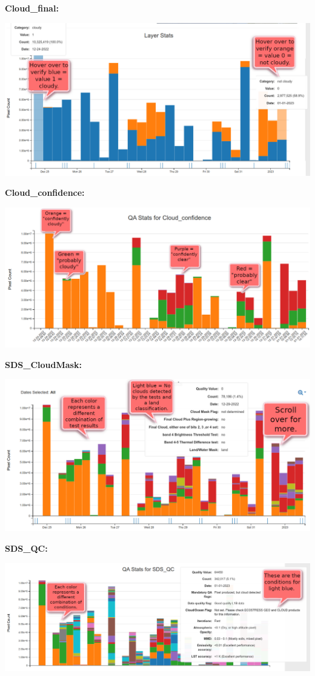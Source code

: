 \documentclass[oneside,a4paper,11pt,explicit]{book}
\begin{document}
	\textbf{Cloud\_final:}
	
	\centerline{\includegraphics[width=.85\textwidth]{Cloud_final_Layer.png}}
	
	\textbf{Cloud\_confidence:}
	\centerline{\includegraphics[width=.85\textwidth]{Cloud_confidence.png}}
	
	\textbf{SDS\_CloudMask:}
	\centerline{\includegraphics[width=.85\textwidth]{SDS_CloudMask_Layer.png}}
	
	\clearpage
	
	\textbf{SDS\_QC:}
	\centerline{\includegraphics[width=\textwidth]{SDS_QC_Layer.png}}
	
\end{document}
